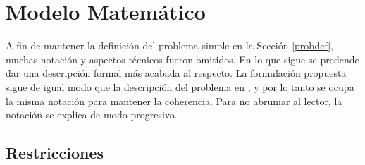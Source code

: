 \documentclass[letter, 10pt]{article}
\begin{document}
\section{Modelo Matemático} \label{model}
A fin de mantener la definición del problema simple en la Sección \ref{probdef}, muchas notación y aspectos técnicos fueron omitidos. En lo que sigue se predende dar una descripción formal más acabada al respecto. La formulación propuesta sigue de igual modo que la descripción del problema en \cite{Problem}, y por lo tanto se ocupa la misma notación para mantener la coherencia. Para no abrumar al lector, la notación se explica de modo progresivo.

\subsection{Restricciones}
\end{document}
